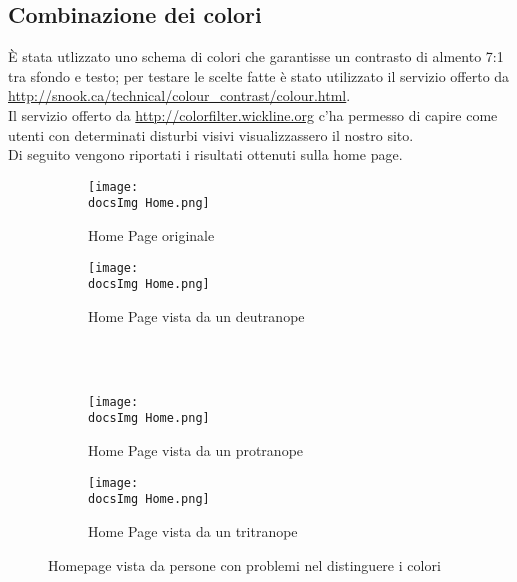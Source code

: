 {	\subsection{Combinazione dei colori}{
		È stata utlizzato uno schema di colori che garantisse un contrasto di almento 7:1 tra sfondo e testo; per testare le scelte fatte è stato utilizzato il servizio offerto da \url{http://snook.ca/technical/colour_contrast/colour.html}.\\
		Il servizio offerto da \url{http://colorfilter.wickline.org} c'ha permesso di capire come utenti con determinati disturbi visivi visualizzassero il nostro sito.\\
		Di seguito vengono riportati i risultati ottenuti sulla home page.
		\begin{figure}[H]
			\begin{subfigure}[b]{0.5\textwidth}
				\texttt{[image: \\docsImg Home.png]}
				\vspace{-40pt}
				\caption{Home Page originale}
				\label{Home Page originale}
			\end{subfigure}
			\begin{subfigure}[b]{0.5\textwidth}
				\texttt{[image: \\docsImg Home.png]}
				\vspace{-40pt}
				\caption{Home Page vista da un deutranope}
				\label{Home Page vista da un deutranope}
			\end{subfigure}
			\\
			\\
			\begin{subfigure}[b]{0.5\textwidth}
				\texttt{[image: \\docsImg Home.png]}
				\vspace{-40pt}
				\caption{Home Page vista da un protranope}
				\label{Home Page vista da un protranope}
			\end{subfigure}
			\begin{subfigure}[b]{0.5\textwidth}
			\texttt{[image: \\docsImg Home.png]}
				\vspace{-40pt}
				\caption{Home Page vista da un tritranope}
				\label{Home Page vista da un tritranope}
			\end{subfigure}
			\caption{Homepage vista da persone con problemi nel distinguere i colori}
			\label{fig: Homepage vista da persone con problemi nel distinguere i colori}
		\end{figure}
	}
}